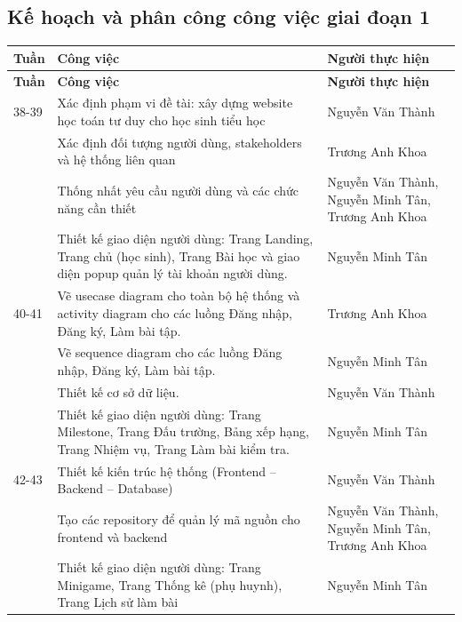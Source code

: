 \subsection{Kế hoạch và phân công công việc giai đoạn 1}

\renewcommand{\arraystretch}{1.3}

\begin{longtable}{|>{\centering\arraybackslash}m{1.5cm}|m{7cm}|m{5cm}|}
	\hline
	\textbf{Tuần} & \textbf{Công việc} & \textbf{Người thực hiện} \\
	\hline
	\endfirsthead
	
	\hline
	\textbf{Tuần} & \textbf{Công việc} & \textbf{Người thực hiện} \\
	\hline
	\endhead
	
	\hline
	\endfoot
	
	38-39 & Xác định phạm vi đề tài: xây dựng website học toán tư duy cho học sinh tiểu học & Nguyễn Văn Thành \\
	\cline{2-3}
	& Xác định đối tượng người dùng, stakeholders và hệ thống liên quan & Trương Anh Khoa \\
	\cline{2-3}
	& Thống nhất yêu cầu người dùng và các chức năng cần thiết & Nguyễn Văn Thành, \newline Nguyễn Minh Tân, \newline Trương Anh Khoa \\
	\cline{2-3}
	& Thiết kế giao diện người dùng: Trang Landing, Trang chủ (học sinh), Trang Bài học và giao diện popup quản lý tài khoản người dùng. & Nguyễn Minh Tân \\
	\hline
	
	40-41 & Vẽ usecase diagram cho toàn bộ hệ thống và activity diagram cho các luồng Đăng nhập, Đăng ký, Làm bài tập. & Trương Anh Khoa \\
	\cline{2-3}
	& Vẽ sequence diagram cho các luồng Đăng nhập, Đăng ký, Làm bài tập. & Nguyễn Minh Tân \\
	\cline{2-3}
	& Thiết kế cơ sở dữ liệu. & Nguyễn Văn Thành \\
	\cline{2-3}
	& Thiết kế giao diện người dùng: Trang Milestone, Trang Đấu trường, Bảng xếp hạng, Trang Nhiệm vụ, Trang Làm bài kiểm tra. & Nguyễn Minh Tân \\
	\hline
	
	42-43 & Thiết kế kiến trúc hệ thống (Frontend – Backend – Database) & Nguyễn Văn Thành \\
	\cline{2-3}
	& Tạo các repository để quản lý mã nguồn cho frontend và backend & Nguyễn Văn Thành, \newline Nguyễn Minh Tân, \newline Trương Anh Khoa \\
	\cline{2-3}
	& Thiết kế giao diện người dùng: Trang Minigame, Trang Thống kê (phụ huynh), Trang Lịch sử làm bài & Nguyễn Minh Tân \\
	\hline
	

\end{longtable}
